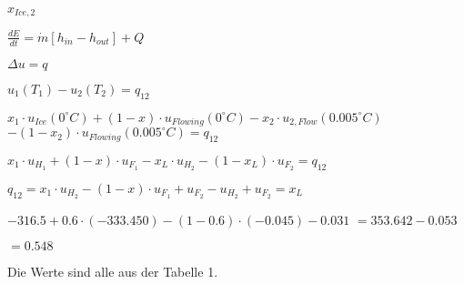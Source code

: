 \( x_{Ice,2} \)  

\( \frac{dE}{dt} = \dot{m} \left[ h_{in} - h_{out} \right] + Q \)  

\( \Delta u = q \)  

\( u_1 (T_1) - u_2 (T_2) = q_{12} \)  

\( x_1 \cdot u_{Ice} (0^\circ C) + (1 - x) \cdot u_{Flowing} (0^\circ C) - x_2 \cdot u_{2,Flow} (0.005^\circ C) \)  
\( - (1 - x_2) \cdot u_{Flowing} (0.005^\circ C) = q_{12} \)  

\( x_1 \cdot u_{H_1} + (1 - x) \cdot u_{F_1} - x_L \cdot u_{H_2} - (1 - x_L) \cdot u_{F_2} = q_{12} \)  

\( q_{12} = x_1 \cdot u_{H_2} - (1 - x) \cdot u_{F_1} + u_{F_2} - u_{H_2} + u_{F_2} = x_L \)  

\( -316.5 + 0.6 \cdot (-333.450) - (1 - 0.6) \cdot (-0.045) - 0.031 \)  
\( = 353.642 - 0.053 \)  

\( = 0.548 \)  

Die Werte sind alle aus der Tabelle 1.